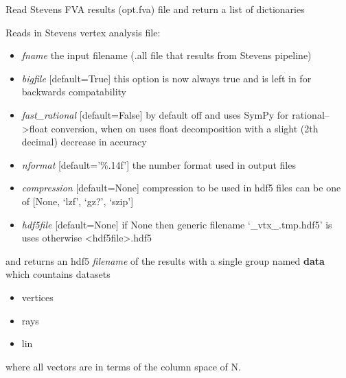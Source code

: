 \documentclass[a4paper,11pt,english]{sphinxmanual}
\begin{document}
\begin{fulllineitems}
\label{modules_doc:cbmpy.CBRead.readSK_FVA}
Read Stevens FVA results (opt.fva) file and return a list of dictionaries

\end{fulllineitems}


\begin{fulllineitems}
\label{modules_doc:cbmpy.CBRead.readSK_vertex}
Reads in Stevens vertex analysis file:
\begin{itemize}
\item {} 
\emph{fname} the input filename (.all file that results from Stevens pipeline)

\item {} 
\emph{bigfile} {[}default=True{]} this option is now always true and is left in for backwards compatability

\item {} 
\emph{fast\_rational} {[}default=False{]} by default off and uses SymPy for rational--\textgreater{}float conversion, when on uses float decomposition with a slight (2th decimal) decrease in accuracy

\item {} 
\emph{nformat} {[}default='\%.14f'{]} the number format used in output files

\item {} 
\emph{compression} {[}default=None{]} compression to be used in hdf5 files can be one of {[}None, `lzf', `gz?', `szip'{]}

\item {} 
\emph{hdf5file} {[}default=None{]} if None then generic filename `\_vtx\_.tmp.hdf5' is uses otherwise \textless{}hdf5file\textgreater{}.hdf5

\end{itemize}

and returns an hdf5 \emph{filename} of the results with a single group named \textbf{data} which countains datasets
\begin{itemize}
\item {} 
vertices

\item {} 
rays

\item {} 
lin

\end{itemize}

where all vectors are in terms of the column space of N.

\end{fulllineitems}
\end{document}
